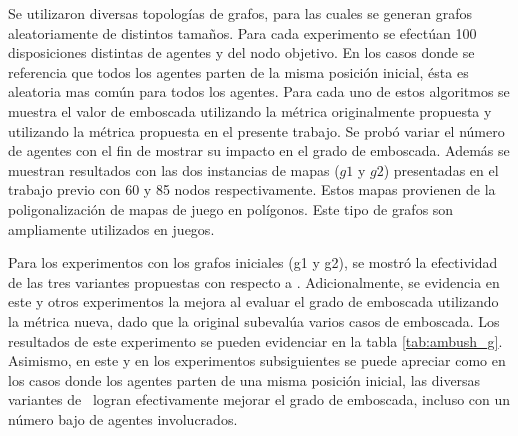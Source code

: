 Se utilizaron diversas topolog\'ias de grafos, para las cuales
se generan grafos aleatoriamente de distintos tamaños. Para cada
experimento se efect\'uan 100 disposiciones distintas de agentes
y del nodo objetivo. En los casos donde se referencia
que todos los agentes parten de la misma posici\'on inicial, \'esta es
aleatoria mas com\'un para todos los agentes.
Para cada uno de estos algoritmos se muestra el valor de emboscada
utilizando la m\'etrica originalmente propuesta y utilizando la
m\'etrica propuesta en el presente trabajo. Se prob\'o variar el
n\'umero de agentes con el fin de mostrar su impacto en el grado de emboscada.
Adem\'as se muestran resultados con las dos instancias de mapas ($g1$ y $g2$)
presentadas en el trabajo previo \cite{FGC12} con 60 y 85 nodos
respectivamente. Estos mapas provienen de la poligonalizaci\'on de mapas
de juego en pol\'igonos. Este tipo de grafos son ampliamente utilizados
en juegos\cite{MF09}.



Para los experimentos con los grafos iniciales (g1 y g2), se mostr\'o
la efectividad de las tres variantes propuestas con respecto a \astar.
Adicionalmente, se evidencia en este y otros experimentos la mejora
al evaluar el grado de emboscada utilizando la m\'etrica nueva, dado
que la original subeval\'ua varios casos de emboscada.
Los resultados de este experimento se pueden evidenciar en la tabla
\ref{tab:ambush_g}. Asimismo, en este y en los experimentos subsiguientes
se puede apreciar como en los casos donde los agentes parten de una misma
posici\'on inicial, las diversas variantes de \ambush\ logran efectivamente
mejorar el grado de emboscada, incluso con un n\'umero bajo de agentes
involucrados.





